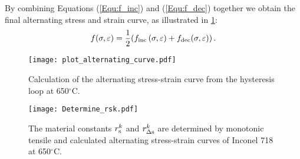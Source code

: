 By combining Equations (\ref{Equ:f_inc}) and (\ref{Equ:f_dec}) together we obtain the final alternating stress and strain curve, as illustrated in \ref{Fig:Alternating_Curve}:
\begin{equation}
f(\sigma,\varepsilon)=\frac{1}{2}(f_{\rm{inc}}\left(\sigma,\varepsilon)+f_{\rm{dec}}(\sigma,\varepsilon)\right).
\end{equation}
\begin{figure}[!htp]
\centering
  \texttt{[image: plot\_alternating\_curve.pdf]}
  \caption{Calculation of the alternating stress-strain curve from the hysteresis loop at 650$^\circ$C.}
  \label{Fig:Alternating_Curve}
\end{figure}
\begin{figure}[!htp]
\centering
\texttt{[image: Determine\_rsk.pdf]}
\caption{The material constants $r_{\rm{s}}^k$ and $r_{\Delta \rm{s}}^k$ are determined by monotonic tensile and calculated alternating stress-strain curves of Inconel 718 at 650$^\circ$C.}
\label{Fig:Determine_rsk}
\end{figure}

